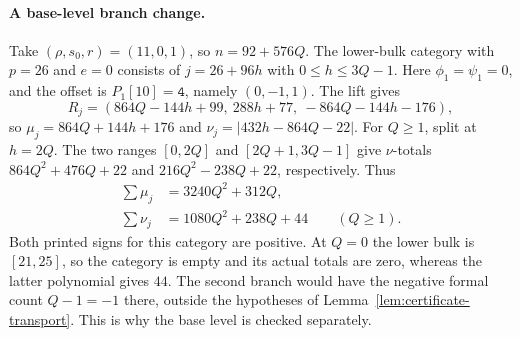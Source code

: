 \paragraph{A base-level branch change.}
Take $(\rho,s_0,r)=(11,0,1)$, so $n=92+576Q$. The lower-bulk category with
$p=26$ and $e=0$ consists of $j=26+96h$ with $0\le h\le3Q-1$.
Here $\phi_1=\psi_1=0$, and the offset is $P_1[10]=\texttt{4}$, namely $(0,-1,1)$.
The lift gives
\[
 R_j=(864Q-144h+99,\ 288h+77,\ -864Q-144h-176),
\]
so $\mu_j=864Q+144h+176$ and $\nu_j=|432h-864Q-22|$.
For $Q\ge1$, split at $h=2Q$. The two ranges $[0,2Q]$ and $[2Q+1,3Q-1]$
give $\nu$-totals $864Q^2+476Q+22$ and $216Q^2-238Q+22$, respectively.
Thus
\[
\begin{aligned}
 \sum\mu_j&=3240Q^2+312Q,\\
 \sum\nu_j&=1080Q^2+238Q+44\qquad(Q\ge1).
\end{aligned}
\]
Both printed signs for this category are positive. At $Q=0$ the lower bulk is $[21,25]$,
so the category is empty and its actual totals are zero, whereas the latter polynomial gives $44$.
The second branch would have the negative formal count $Q-1=-1$ there, outside the hypotheses
of Lemma~\ref{lem:certificate-transport}. This is why the base level is checked separately.

